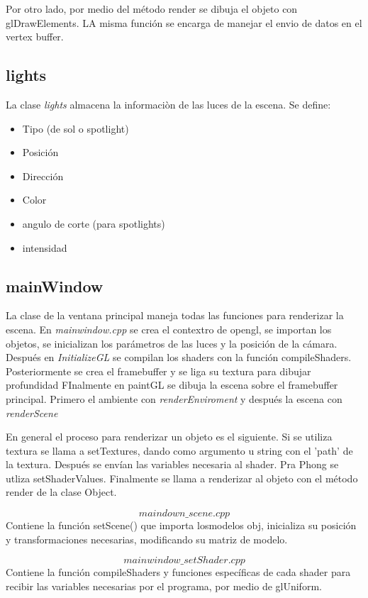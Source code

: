 \documentclass[12pt]{article}
\begin{document}
Por otro lado, por medio del método render se dibuja el objeto con glDrawElements. LA misma función se encarga de manejar el envio de datos en el vertex buffer.


\subsection{lights}
La clase \textit{lights} almacena la informaciòn de las luces de la escena. Se define:
\begin{itemize}
\item Tipo (de sol o spotlight)
\item Posición
\item Dirección
\item Color
\item angulo de corte (para spotlights)
\item intensidad
\end{itemize}

\subsection{mainWindow}
La clase de la ventana principal maneja todas las funciones para renderizar la escena.
En \textit{mainwindow.cpp} se crea el contextro de opengl, se importan los objetos, se inicializan los parámetros de las luces y la posición de la cámara.
 Después en \textit{InitializeGL} se compilan los shaders con la función compileShaders. Posteriormente se crea el framebuffer y se liga su textura para dibujar profundidad
 FInalmente en paintGL se dibuja la escena sobre el framebuffer principal. Primero el ambiente con \textit{renderEnviroment} y después la escena con \textit{renderScene}
 
 En general el proceso para renderizar un objeto es el siguiente. Si se utiliza textura se llama a setTextures, dando como argumento u string con el 'path' de la textura. Después se envían las variables necesaria al shader. Pra Phong se utliza setShaderValues. Finalmente se llama a renderizar al objeto con el método render de la clase Object.
 
\textbf{$$maindown\_scene.cpp$$}
Contiene la función setScene() que importa losmodelos obj, inicializa su posición y transformaciones necesarias, modificando su matriz de modelo. 

\textbf{$$mainwindow\_setShader.cpp$$}
Contiene la función compileShaders y funciones específicas de cada shader para recibir las variables necesarias por el programa, por medio de glUniform.
\end{document}
